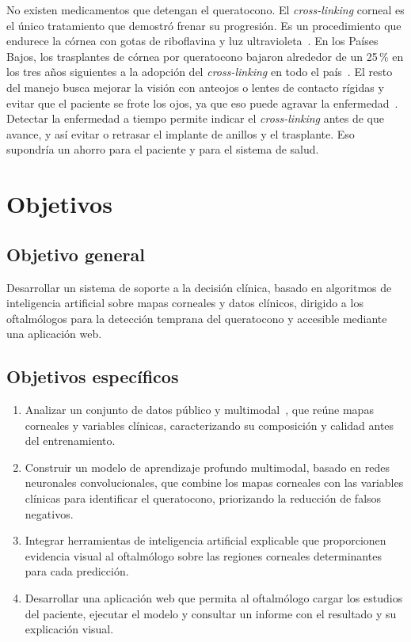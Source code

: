         No existen medicamentos que detengan el queratocono. El \textit{cross-linking} corneal es el único tratamiento que demostró frenar su progresión. Es un procedimiento que endurece la córnea con gotas de riboflavina y luz ultravioleta~\cite{cxl_cochrane}. En los Países Bajos, los trasplantes de córnea por queratocono bajaron alrededor de un 25\,\% en los tres años siguientes a la adopción del \textit{cross-linking} en todo el país~\cite{cxl_trasplantes}. El resto del manejo busca mejorar la visión con anteojos o lentes de contacto rígidas y evitar que el paciente se frote los ojos, ya que eso puede agravar la enfermedad~\cite{statpearls_kc}. Detectar la enfermedad a tiempo permite indicar el \textit{cross-linking} antes de que avance, y así evitar o retrasar el implante de anillos y el trasplante. Eso supondría un ahorro para el paciente y para el sistema de salud.

\section{Objetivos}

    \subsection*{Objetivo general}
    
        Desarrollar un sistema de soporte a la decisión clínica, basado en algoritmos de inteligencia artificial sobre mapas corneales y datos clínicos, dirigido a los oftalmólogos para la detección temprana del queratocono y accesible mediante una aplicación web.

    \subsection*{Objetivos específicos}

        \begin{enumerate}[label=\textbf{\arabic*)}]
            \item Analizar un conjunto de datos público y multimodal~\cite{zenodo}, que reúne mapas corneales y variables clínicas, caracterizando su composición y calidad antes del entrenamiento.

            \item Construir un modelo de aprendizaje profundo multimodal, basado en redes neuronales convolucionales, que combine los mapas corneales con las variables clínicas para identificar el queratocono, priorizando la reducción de falsos negativos.

            \item Integrar herramientas de inteligencia artificial explicable que proporcionen evidencia visual al oftalmólogo sobre las regiones corneales determinantes para cada predicción.

            \item Desarrollar una aplicación web que permita al oftalmólogo cargar los estudios del paciente, ejecutar el modelo y consultar un informe con el resultado y su explicación visual.
        \end{enumerate}

